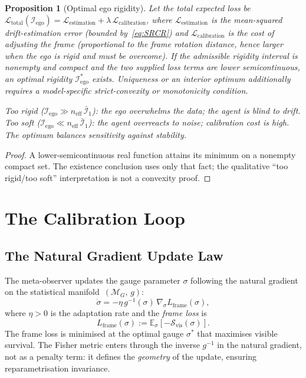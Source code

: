 \documentclass[12pt]{article}
\newtheorem{proposition}[theorem]{Proposition}
\begin{document}
\begin{proposition}[Optimal ego rigidity]
\label{prop:optimal_rigidity}
Let the total expected loss be
$\mathcal{L}_{\mathrm{total}}
(\mathcal{I}_{\mathrm{ego}})
= \mathcal{L}_{\mathrm{estimation}}
+ \lambda\,\mathcal{L}_{\mathrm{calibration}}$,
where $\mathcal{L}_{\mathrm{estimation}}$ is the
mean-squared drift-estimation error
(bounded by~\eqref{eq:SRCR}) and
$\mathcal{L}_{\mathrm{calibration}}$ is the cost of
adjusting the frame (proportional to the frame rotation
distance, hence larger when the ego is rigid and must be
overcome).
If the admissible rigidity interval is nonempty and compact and the two
supplied loss terms are lower semicontinuous, an optimal rigidity
$\mathcal{I}_{\mathrm{ego}}^*$ exists.  Uniqueness or an interior
optimum additionally requires a model-specific strict-convexity or
monotonicity condition.

\emph{Too rigid}
($\mathcal{I}_{\mathrm{ego}} \gg n_{\mathrm{eff}}\,\bar{\mathcal I}_1$):
the ego overwhelms the data; the agent is blind to drift.
\emph{Too soft}
($\mathcal{I}_{\mathrm{ego}} \ll n_{\mathrm{eff}}\,\bar{\mathcal I}_1$):
the agent overreacts to noise; calibration cost is high.
The optimum balances sensitivity against stability.
\end{proposition}

\begin{proof}
A lower-semicontinuous real function attains its minimum on a nonempty
compact set.  The existence conclusion uses only that fact; the
qualitative ``too rigid/too soft'' interpretation is not a convexity
proof.
\end{proof}

\section{The Calibration Loop}
\label{sec:loop}

\subsection{The Natural Gradient Update Law}
\label{subsec:update_law}

The meta-observer updates the gauge parameter $\sigma$
following the natural gradient on the statistical
manifold~$(\mathcal{M}_G,\,g)$:
\begin{equation}
\label{eq:update_law}
\dot{\sigma}
= -\eta\,g^{-1}(\sigma)\,
  \nabla_\sigma L_{\mathrm{frame}}(\sigma),
\end{equation}
where $\eta > 0$ is the adaptation rate and the
\emph{frame loss} is
\begin{equation}
\label{eq:frame_loss}
L_{\mathrm{frame}}(\sigma)
:= \mathbb{E}_\sigma\!\left[
  -\mathcal{S}_{\mathrm{vis}}(\sigma)\right].
\end{equation}
The frame loss is minimised at the optimal gauge
$\sigma^*$ that maximises visible survival.
The Fisher metric enters through the inverse $g^{-1}$
in the natural gradient, not as a penalty term:
it defines the \emph{geometry} of the update, ensuring
reparametrisation invariance.
\end{document}
